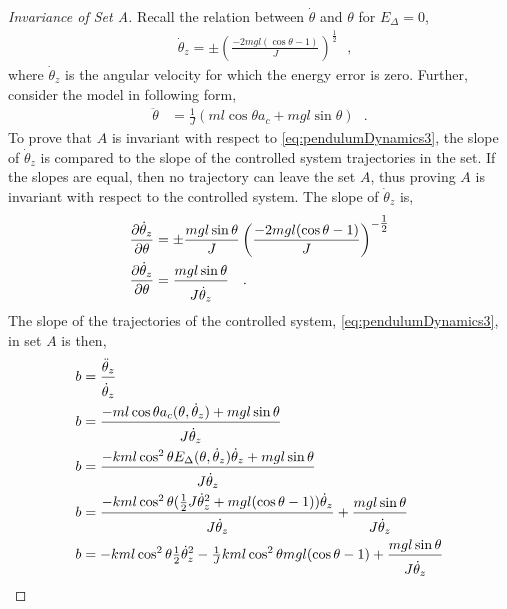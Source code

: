 \begin{proof}[Invariance of Set A]
  \label{pr:invariantA}
  Recall the relation between $\dot{\theta}$ and $\theta$ for $E_\Delta = 0$,
  \begin{align}
    &\dot{\theta}_z = \pm \left(\frac{-2 m g l (\cos \theta -1)}{J}\right)^{\tfrac{1}{2}}  \ \ \ ,  \label{eq:thetaDotForEDeltaZero}
  \end{align}
  where $\dot{\theta}_z$ is the angular velocity for which the energy error is zero. Further, consider the model in following form,
  \begin{align}
    \ddot{\theta} &= \tfrac{1}{J} ( m l \cos \theta a_c + m g l \sin \theta ) \ \ \ .  \label{eq:pendulumDynamics3}
  \end{align}
  To prove that $A$ is invariant with respect to \autoref{eq:pendulumDynamics3}, the slope of $\dot{\theta}_z$ is compared to the slope of the controlled system trajectories in the set. If the slopes are equal, then no trajectory can leave the set $A$, thus proving $A$ is invariant with respect to the controlled system. The slope of $\dot{\theta}_z$ is,
  \begin{align}
    \frac{\partial \dot{\theta}_z}{\partial \theta} &= \pm \frac{m g l \sin\theta}{ J } \left(\frac{-2 m g l (\cos \theta -1)}{J}\right)^{-\tfrac{1}{2}} \\
    \frac{\partial \dot{\theta}_z}{\partial \theta} &= \frac{m g l \sin\theta}{ J \rule{0pt}{12pt}\dot{\theta}_z}  \ \ \ .  \label{eq:thetaDotForEDeltaZero_dTheta}
  \end{align}
  The slope of the trajectories of the controlled system, \autoref{eq:pendulumDynamics3}, in set $A$ is then,
  \begin{align}
    b &= \frac{\ddot{\theta}_z}{\rule{0pt}{12pt}\dot{\theta}_z} \\
    b &= \frac{- m l \cos \theta a_c( \theta, \dot{\theta}_z ) + m g l \sin \theta}{ J \rule{0pt}{12pt}\dot{\theta}_z} \\
    b &= \frac{- k m l \cos^2 \theta E_\Delta( \theta, \dot{\theta}_z ) \dot{\theta}_z + m g l \sin \theta}{ J \rule{0pt}{12pt}\dot{\theta}_z} \\
    b &= \frac{- k m l \cos^2 \theta ( \tfrac{1}{2} J \dot{\theta}_z^2 + m g l (\cos \theta -1)  ) \dot{\theta}_z}{ J \rule{0pt}{12pt}\dot{\theta}_z}  +  \frac{m g l \sin \theta}{ J \rule{0pt}{12pt}\dot{\theta}_z} \\
    b &= - k m l \cos^2 \theta \tfrac{1}{2} \dot{\theta}_z^2 - \tfrac{1}{J} k m l \cos^2 \theta m g l (\cos \theta -1)  +  \frac{m g l \sin \theta}{ J \rule{0pt}{12pt}\dot{\theta}_z} \\

\end{align}
\end{proof}
